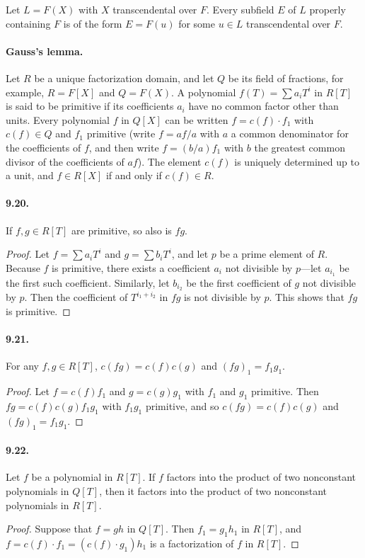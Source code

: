\begin{theorem}[9.19, L\"uroth]
Let $L=F(X)$ with $X$ transcendental over $F$. Every subfield $E$ of $L$ properly containing $F$ is of the form $E=F(u)$ for some $u\in L$ transcendental over $F$.
\end{theorem}
\paragraph{Gauss's lemma.}
Let $R$ be a unique factorization domain, and let $Q$ be its field of fractions, for example, $R=F[X]$ and $Q=F(X)$. A polynomial $f(T)=\sum a_iT^i$ in $R[T]$ is said to be primitive if its coefficients $a_i$ have no common factor other than units. Every polynomial $f$ in $Q[X]$ can be written $f=c(f)\cdot f_1$ with $c(f)\in Q$ and $f_1$ primitive (write $f=af/a$ with $a$ a common denominator for the coefficients of $f$, and then write $f=(b/a)f_1$ with $b$ the greatest common divisor of the coefficients of $af$). The element $c(f)$ is uniquely determined up to a unit, and $f\in R[X]$ if and only if $c(f)\in R$.

\paragraph{9.20.} If $f,g\in R[T]$ are primitive, so also is $fg$.
\begin{proof}
Let $f=\sum a_iT^i$ and $g=\sum b_iT^i$, and let $p$ be a prime element of $R$. Because $f$ is primitive, there exists a coefficient $a_i$ not divisible by $p$---let $a_{i_1}$ be the first such coefficient. Similarly, let $b_{i_2}$ be the first coefficient of $g$ not divisible by $p$. Then the coefficient of $T^{i_1+i_2}$ in $fg$ is not divisible by $p$. This shows that $fg$ is primitive.
\end{proof}
\paragraph{9.21.} For any $f,g\in R[T]$, $c(fg)=c(f)c(g)$ and $(fg)_1=f_1g_1$.
\begin{proof}
Let $f=c(f)f_1$ and $g=c(g)g_1$ with $f_1$ and $g_1$ primitive. Then $fg=c(f)c(g)f_1g_1$ with $f_1g_1$ primitive, and so $c(fg)=c(f)c(g)$ and $(fg)_1=f_1g_1$.
\end{proof}
\paragraph{9.22.} Let $f$ be a polynomial in $R[T]$. If $f$ factors into the product of two nonconstant polynomials in $Q[T]$, then it factors into the product of two nonconstant polynomials in $R[T]$.
\begin{proof}
Suppose that $f=gh$ in $Q[T]$. Then $f_1=g_1h_1$ in $R[T]$, and $f=c(f)\cdot f_1=(c(f)\cdot g_1)h_1$ is a factorization of $f$ in $R[T]$.
\end{proof}
